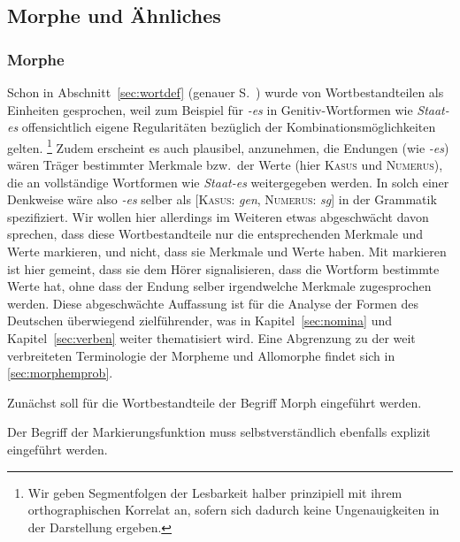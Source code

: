 \subsection{Morphe und Ähnliches}

\label{sec:morpheme}

\subsubsection{Morphe}

Schon in Abschnitt~\ref{sec:wortdef} (genauer S.~\pageref{arbref:9234645}) wurde von Wortbestandteilen als Einheiten gesprochen, weil zum Beispiel für \textit{-es} in Genitiv-Wortformen wie \textit{Staat-es} offensichtlich eigene Regularitäten bezüglich der Kombinationsmöglichkeiten gelten.%
\footnote{Wir geben Segmentfolgen der Lesbarkeit halber prinzipiell mit ihrem orthographischen Korrelat an, sofern sich dadurch keine Ungenauigkeiten in der Darstellung ergeben.}
Zudem erscheint es auch plausibel, anzunehmen, die Endungen (wie \textit{-es}) wären Träger bestimmter Merkmale bzw.\ der Werte (hier \textsc{Kasus} und \textsc{Numerus}), die an vollständige Wortformen wie \textit{Staat-es} weitergegeben werden.
In solch einer Denkweise wäre also \textit{-es} selber als [\textsc{Kasus}: \textit{gen}, \textsc{Numerus}: \textit{sg}] in der Grammatik spezifiziert.
Wir wollen hier allerdings im Weiteren etwas abgeschwächt davon sprechen, dass diese Wortbestandteile nur die entsprechenden Merkmale und Werte markieren, und nicht, dass sie Merkmale und Werte haben.
Mit markieren ist hier gemeint, dass sie dem Hörer signalisieren, dass die Wortform bestimmte Werte hat, ohne dass der Endung selber irgendwelche Merkmale zugesprochen werden.
Diese abgeschwächte Auffassung ist für die Analyse der Formen des Deutschen überwiegend zielführender, was in Kapitel~\ref{sec:nomina} und Kapitel~\ref{sec:verben} weiter thematisiert wird.
Eine Abgrenzung zu der weit verbreiteten Terminologie der Morpheme und Allomorphe findet sich in \ref{sec:morphemprob}.

Zunächst soll für die Wortbestandteile der Begriff Morph eingeführt werden.


Der Begriff der Markierungsfunktion muss selbstverständlich ebenfalls explizit eingeführt werden.


